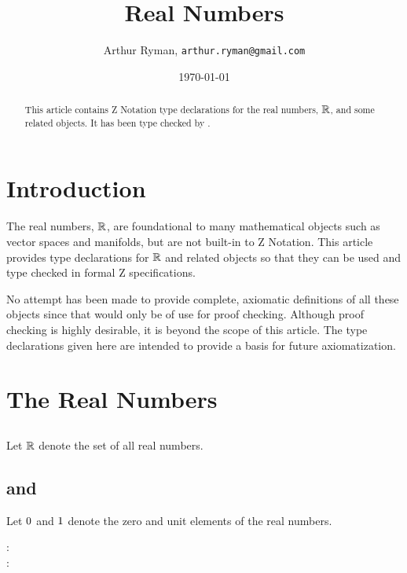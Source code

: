\documentclass[11pt, oneside]{article}
\title{Real Numbers}
\author{Arthur Ryman, {\tt arthur.ryman@gmail.com}}
\date{\today}
\begin{document}
\maketitle

\begin{abstract}
This article contains Z Notation type declarations for the real numbers, $\mathbb{R}$, and some related objects.
It has been type checked by \fuzz.
\end{abstract}

\section{Introduction}

The real numbers, $\mathbb{R}$, are foundational to many mathematical objects such as vector spaces and manifolds,
but are not built-in to Z Notation.
This article provides type declarations for $\mathbb{R}$ and related objects so that they can be used and type checked in formal Z specifications.

No attempt has been made to provide complete, axiomatic definitions of all these objects since that would only be of use for proof checking.
Although proof checking is highly desirable, it is beyond the scope of this article.
The type declarations given here are intended to provide a basis for future axiomatization.

\section{The Real Numbers}

\subsection{}

Let $\mathbb{R}$ denote the set of all real numbers.
\begin{zed}
	[\R]
\end{zed}

\subsection{ and }

Let $0$ and $1$ denote the zero and unit elements of the real numbers.

\begin{axdef}
	\zeroR: \R \\
	\oneR: \R
\end{axdef}
\end{document}
